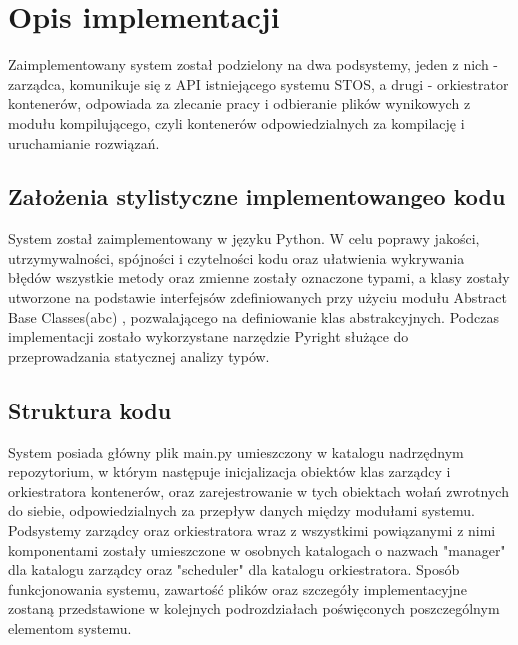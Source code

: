 \section{Opis implementacji}
Zaimplementowany system został podzielony na dwa podsystemy, jeden z nich - zarządca, komunikuje się z API istniejącego systemu STOS, a drugi - orkiestrator kontenerów, odpowiada za zlecanie pracy i odbieranie plików wynikowych z modułu kompilującego, czyli kontenerów odpowiedzialnych za kompilację i uruchamianie rozwiązań.

\subsection{Założenia stylistyczne implementowangeo kodu}
System został zaimplementowany w języku Python. W celu poprawy jakości, utrzymywalności, spójności i czytelności kodu oraz ułatwienia wykrywania błędów wszystkie metody oraz zmienne zostały oznaczone typami, a klasy zostały utworzone na podstawie interfejsów zdefiniowanych przy użyciu modułu Abstract Base Classes(abc) \cite{pythonAbc}, pozwalającego na definiowanie klas abstrakcyjnych. Podczas implementacji zostało wykorzystane narzędzie Pyright służące do przeprowadzania statycznej analizy typów.

\subsection{Struktura kodu}
System posiada główny plik main.py umieszczony w katalogu nadrzędnym repozytorium, w którym następuje inicjalizacja obiektów klas zarządcy i orkiestratora kontenerów, oraz zarejestrowanie w tych obiektach wołań zwrotnych do siebie, odpowiedzialnych za przepływ danych między modułami systemu. Podsystemy zarządcy oraz orkiestratora wraz z wszystkimi powiązanymi z nimi komponentami zostały umieszczone w osobnych katalogach o nazwach "manager" dla katalogu zarządcy oraz "scheduler" dla katalogu orkiestratora.
Sposób funkcjonowania systemu, zawartość plików oraz szczegóły implementacyjne zostaną przedstawione w kolejnych podrozdziałach poświęconych poszczególnym elementom systemu. 
